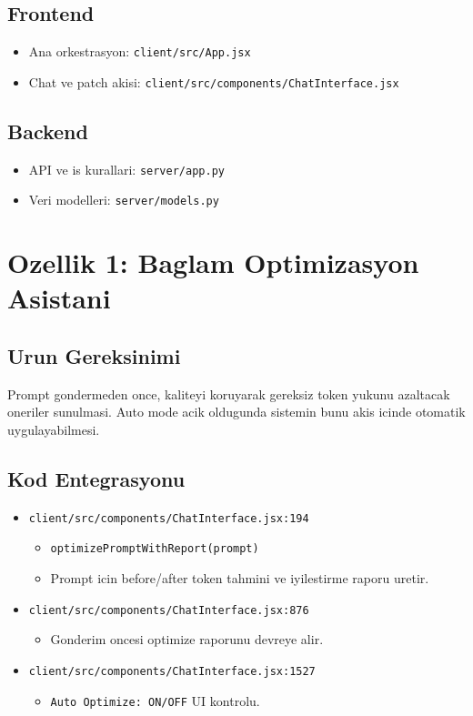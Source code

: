\documentclass[12pt,a4paper]{article}
\begin{document}
\subsection{Frontend}
\begin{itemize}[leftmargin=*]
  \item Ana orkestrasyon: \texttt{client/src/App.jsx}
  \item Chat ve patch akisi: \texttt{client/src/components/ChatInterface.jsx}
\end{itemize}

\subsection{Backend}
\begin{itemize}[leftmargin=*]
  \item API ve is kurallari: \texttt{server/app.py}
  \item Veri modelleri: \texttt{server/models.py}
\end{itemize}

\section{Ozellik 1: Baglam Optimizasyon Asistani}
\subsection{Urun Gereksinimi}
Prompt gondermeden once, kaliteyi koruyarak gereksiz token yukunu azaltacak oneriler sunulmasi.
Auto mode acik oldugunda sistemin bunu akis icinde otomatik uygulayabilmesi.

\subsection{Kod Entegrasyonu}
\begin{itemize}[leftmargin=*]
  \item \texttt{client/src/components/ChatInterface.jsx:194}
  \begin{itemize}[leftmargin=*]
    \item \texttt{optimizePromptWithReport(prompt)}
    \item Prompt icin before/after token tahmini ve iyilestirme raporu uretir.
  \end{itemize}

  \item \texttt{client/src/components/ChatInterface.jsx:876}
  \begin{itemize}[leftmargin=*]
    \item Gonderim oncesi optimize raporunu devreye alir.
  \end{itemize}

  \item \texttt{client/src/components/ChatInterface.jsx:1527}
  \begin{itemize}[leftmargin=*]
    \item \texttt{Auto Optimize: ON/OFF} UI kontrolu.
  \end{itemize}
\end{itemize}
\end{document}
